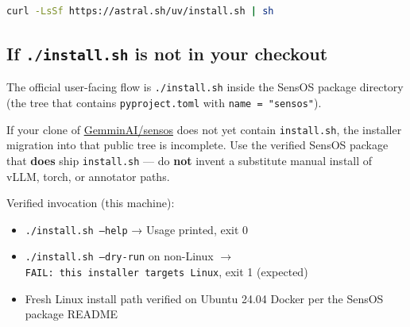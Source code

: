 \documentclass[11pt,a4paper,oneside]{article}
\newcommand{\pathcode}[1]{\texttt{#1}}
\begin{document}
\begin{lstlisting}[language=bash]
curl -LsSf https://astral.sh/uv/install.sh | sh
\end{lstlisting}

\subsection{If \texttt{./install.sh} is not in your checkout}

The official user-facing flow is \pathcode{./install.sh} inside the SensOS package directory (the tree that contains \pathcode{pyproject.toml} with \pathcode{name = "sensos"}).

If your clone of \href{https://github.com/GemminAI/sensos}{GemminAI/sensos} does not yet contain \pathcode{install.sh}, the installer migration into that public tree is incomplete. Use the verified SensOS package that \textbf{does} ship \pathcode{install.sh} — do \textbf{not} invent a substitute manual install of vLLM, torch, or annotator paths.

Verified invocation (this machine):

\begin{itemize}
  \item \pathcode{./install.sh --help} → Usage printed, exit 0
  \item \texttt{./install.sh\ --dry-run} on non-Linux $\rightarrow$\\
        \texttt{FAIL: this installer targets Linux}, exit 1 (expected)
  \item Fresh Linux install path verified on Ubuntu 24.04 Docker per the SensOS package README
\end{itemize}

\begin{center}
\end{center}
\end{document}
